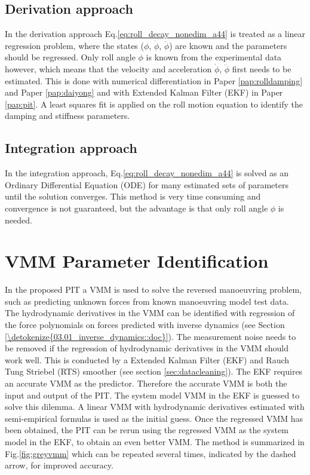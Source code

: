\subsection{Derivation approach}\label{sec:derivation_approach}
In the derivation approach Eq.\ref{eq:roll_decay_nonedim_a44} is treated as a linear regression problem, where the states ($\phi$, $\dot{\phi}$, $\ddot{\phi}$) are known and the parameters should be regressed. Only roll angle $\phi$ is known from the experimental data however, which means that the velocity and acceleration $\dot{\phi}$, $\ddot{\phi}$ first needs to be estimated. This is done with numerical differentiation in Paper \ref{pap:rolldamping} and Paper \ref{pap:daiyong} and with Extended Kalman Filter (EKF) in Paper \ref{pap:pit}.
A least squares fit is applied on the roll motion equation to identify the damping and stiffness parameters.

\subsection{Integration approach}\label{sec:integration_approach}
In the integration approach, Eq.\ref{eq:roll_decay_nonedim_a44} is solved as an Ordinary Differential Equation (ODE) for many estimated sets of parameters until the solution converges. This method is very time consuming and convergence is not guaranteed, but the advantage is that only roll angle $\phi$ is needed.

\section{VMM Parameter Identification} \label{sec:PIT_VMM}
In the proposed PIT a VMM is used to solve the reversed manoeuvring problem, such as predicting unknown forces from known manoeuvring model test data. The hydrodynamic derivatives in the VMM can be identified with regression of the force polynomials on forces predicted with inverse dynamics (see Section \ref{\detokenize{03.01_inverse_dynamics::doc}}).
The measurement noise needs to be removed if the regression of hydrodynamic derivatives in the VMM should work well. This is conducted by a Extended Kalman Filter (EKF) and Rauch Tung Striebel (RTS) smoother (see section \ref{sec:datacleaning}). The EKF requires an accurate VMM as the predictor.
Therefore the accurate VMM is both the input and output of the PIT. The system model VMM in the EKF is guessed to solve this dilemma. A linear VMM with hydrodynamic derivatives estimated with semi-empirical formulas is used as the initial guess. Once the regressed VMM has been obtained, the PIT can be rerun using the regressed VMM as the system model in the EKF, to obtain an even better VMM. The method is summarized in Fig.\ref{fig:greyvmm} which can be repeated several times, indicated by the dashed arrow, for improved accuracy. 

